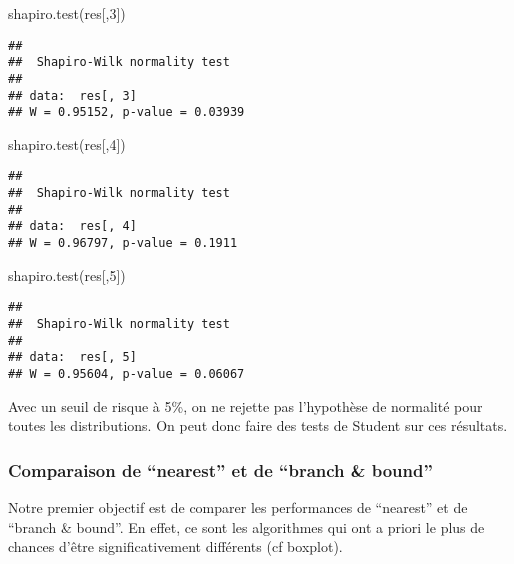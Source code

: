 \documentclass[
]{article}
\newenvironment{Shaded}{\begin{snugshade}}{\end{snugshade}}
\newcommand{\DecValTok}[1]{\textcolor[rgb]{0.00,0.00,0.81}{#1}}
\newcommand{\FunctionTok}[1]{\textcolor[rgb]{0.00,0.00,0.00}{#1}}
\newcommand{\NormalTok}[1]{#1}
\begin{document}
\begin{Shaded}
\begin{Highlighting}[]
\FunctionTok{shapiro.test}\NormalTok{(res[,}\DecValTok{3}\NormalTok{])}
\end{Highlighting}
\end{Shaded}

\begin{verbatim}
## 
##  Shapiro-Wilk normality test
## 
## data:  res[, 3]
## W = 0.95152, p-value = 0.03939
\end{verbatim}

\begin{Shaded}
\begin{Highlighting}[]
\FunctionTok{shapiro.test}\NormalTok{(res[,}\DecValTok{4}\NormalTok{])}
\end{Highlighting}
\end{Shaded}

\begin{verbatim}
## 
##  Shapiro-Wilk normality test
## 
## data:  res[, 4]
## W = 0.96797, p-value = 0.1911
\end{verbatim}

\begin{Shaded}
\begin{Highlighting}[]
\FunctionTok{shapiro.test}\NormalTok{(res[,}\DecValTok{5}\NormalTok{])}
\end{Highlighting}
\end{Shaded}

\begin{verbatim}
## 
##  Shapiro-Wilk normality test
## 
## data:  res[, 5]
## W = 0.95604, p-value = 0.06067
\end{verbatim}

Avec un seuil de risque à 5\%, on ne rejette pas l'hypothèse de
normalité pour toutes les distributions. On peut donc faire des tests de
Student sur ces résultats.

\hypertarget{comparaison-de-nearest-et-de-branch-bound}{%
\subsubsection{Comparaison de ``nearest'' et de ``branch \&
bound''}\label{comparaison-de-nearest-et-de-branch-bound}}

Notre premier objectif est de comparer les performances de ``nearest''
et de ``branch \& bound''. En effet, ce sont les algorithmes qui ont a
priori le plus de chances d'être significativement différents (cf
boxplot).
\end{document}
